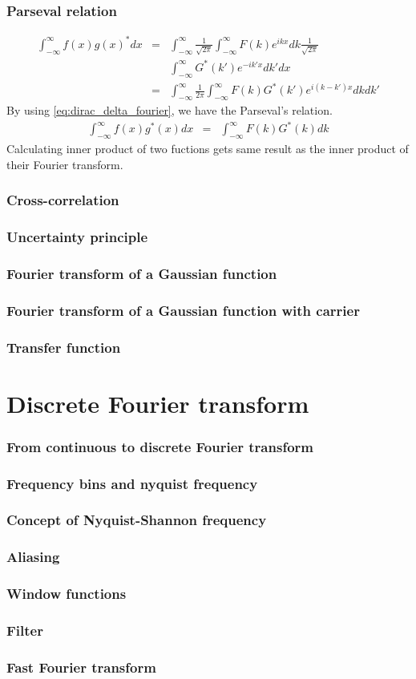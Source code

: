 \documentclass{beamer}
\begin{document}
\begin{frame}
\frametitle{Parseval relation}
\begin{eqnarray}
\int_{-\infty}^{\infty}f(x)g(x)^* dx &=&\int_{-\infty}^{\infty}  \frac{1}{\sqrt{2\pi}} \int_{-\infty}^{\infty} F(k) e^{ikx}dk \frac{1}{\sqrt{2\pi}} \nonumber \\
&&\int_{-\infty}^{\infty}G^*(k') e^{-ik'x}dk' dx\nonumber \\
&=&\int_{-\infty}^{\infty} \frac{1}{2\pi} \int_{-\infty}^{\infty} F(k)G^*(k')e^{i(k-k')x} dk dk' \nonumber
\end{eqnarray}
By using \ref{eq:dirac_delta_fourier}, we have the Parseval's relation.
\begin{eqnarray}
\int_{-\infty}^{\infty}f(x)g^*(x) dx &=& \int_{-\infty}^{\infty}F(k)G^*(k)dk
\label{eq:parseval_relation}
\end{eqnarray}
Calculating inner product of two fuctions gets same result as the inner product of their Fourier transform.
\end{frame}
\begin{frame}
\frametitle{Cross-correlation}

\end{frame}
\begin{frame}
\frametitle{Uncertainty principle}
\end{frame}
\begin{frame}
\frametitle{Fourier transform of a Gaussian function}
\end{frame}
\begin{frame}
\frametitle{Fourier transform of a Gaussian function with carrier}
\end{frame}
\begin{frame}
\frametitle{Transfer function}
\end{frame}
\section{Discrete Fourier transform}
\begin{frame}
\frametitle{From continuous to discrete Fourier transform}
\end{frame}
\begin{frame}
\frametitle{Frequency bins and nyquist frequency}
\end{frame}
\begin{frame}
\frametitle{Concept of Nyquist-Shannon frequency}
\end{frame}
\begin{frame}
\frametitle{Aliasing}
\end{frame}
\begin{frame}
\frametitle{Window functions}
\end{frame}
\begin{frame}
\frametitle{Filter}
\end{frame}
\begin{frame}
\frametitle{Fast Fourier transform}
\end{frame}
\end{document}
